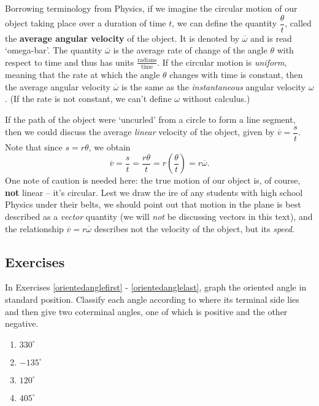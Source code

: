 \documentclass[10pt]{article}
\begin{document}
Borrowing terminology from Physics, if we imagine the circular motion of our object taking place over a duration of time $t$, we can define the quantity $\dfrac{\theta}{t}$, called the \textbf{average angular velocity} of the object.  It is denoted by $\overline{\omega}$ and is read `omega-bar'.  The quantity $\overline{\omega}$ is the average rate of change of the angle $\theta$ with respect to time and thus has units $\frac{\text{radians}}{\text{time}}$. If the circular motion is \textit{uniform}, meaning that the rate at which the angle $\theta$ changes with time is constant, then the average angular velocity $\overline{\omega}$ is the same as the \textit{instantaneous} angular velocity $\omega$. (If the rate is not constant, we can't define $\omega$ without calculus.)  

\smallskip

If the path of the object were `uncurled' from a circle to form a line segment, then we could discuss the average \textit{linear} velocity of the object, given by $\overline{v} = \dfrac{s}{t}$. Note that since $s = r\theta$, we obtain
\[
\overline{v} = \frac{s}{t} = \frac{r\theta}{t} = r\left(\frac{\theta}{t}\right) = r\overline{\omega}.
\]
One note of caution is needed here: the true motion of our object is, of course, \textbf{not} linear -- it's circular. Lest we draw the ire of any students with high school Physics under their belts, we should point out that motion in the plane is best described as a \textit{vector} quantity (we will \textit{not} be discussing vectors in this text), and the relationship $\overline{v} = r\overline{\omega}$ describes not the velocity of the object, but its \textit{speed}. 


\newpage

\subsection{Exercises}


In Exercises \ref{orientedanglefirst} - \ref{orientedanglelast}, graph the oriented angle in standard position. Classify each angle according to where its terminal side lies and then give two coterminal angles, one of which is positive and the other negative.

\begin{multicols}{4} 

\begin{enumerate}

\setcounter{enumi}{\value{HW}}

\item $330^{\circ}$ \label{orientedanglefirst}
\item $-135^{\circ}$
\item $120^{\circ}$
\item $405^{\circ}$

\setcounter{HW}{\value{enumi}}

\end{enumerate}

\end{multicols}
\end{document}
